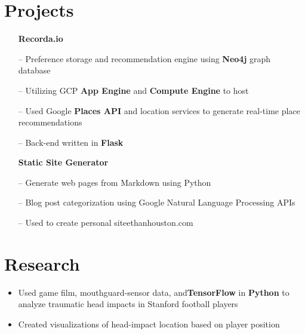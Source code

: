 \documentclass[]{houston-ethan-resume}
\begin{document}
\begin{minipage}[t]{0.66\textwidth}
\section{Projects}
\begin{multicols}{2}
\begin{itemize}
\item[] \textbf{Recorda.io}
\item[--] Preference storage and recommendation engine using \textbf{Neo4j} graph database
\item[--] Utilizing GCP \textbf{App Engine} and \textbf{Compute Engine} to host 
\item[--] Used Google \textbf{Places API} and location services to generate real-time place recommendations
\item[--] Back-end written in \textbf{Flask}
\end{itemize}
\columnbreak
\begin{itemize}
\item[] \textbf{Static Site Generator}
\item[--] Generate web pages from Markdown using Python
\item[--] Blog post categorization using Google ​Natural Language Processing​ APIs
\item[--] Used to create personal site ​ethanhouston.com​
\end{itemize}
\end{multicols}


\section{Research}
\begin{itemize}
\item Used game film, mouthguard-sensor data, and ​\textbf{TensorFlow}​ in ​​\textbf{Python} ​to analyze traumatic head impacts in Stanford football players
\item Created visualizations of head-impact location based on player position
\end{itemize}
\sectionsep

\end{minipage}
\end{document}
